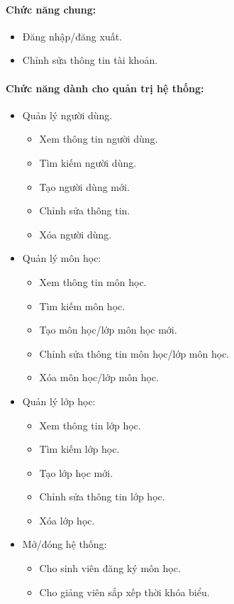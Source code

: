 \documentclass{article}
\begin{document}
    \paragraph{Chức năng chung:}
    \begin{itemize}
      \item Đăng nhập/đăng xuất.
      \item Chỉnh sửa thông tin tài khoản.
    \end{itemize}

    \paragraph{Chức năng dành cho quản trị hệ thống:}
    \begin{itemize}
      \item Quản lý người dùng.
      \begin{itemize}
        \item Xem thông tin người dùng.
        \item Tìm kiếm người dùng.
        \item Tạo người dùng mới.
        \item Chỉnh sửa thông tin.
        \item Xóa người dùng.
      \end{itemize}
      \item Quản lý môn học:
      \begin{itemize}
        \item Xem thông tin môn học.
        \item Tìm kiếm môn học.
        \item Tạo môn học/lớp môn học mới.
        \item Chỉnh sửa thông tin môn học/lớp môn học.
        \item Xóa môn học/lớp môn học.
      \end{itemize}
      \item Quản lý lớp học:
      \begin{itemize}
        \item Xem thông tin lớp học.
        \item Tìm kiếm lớp học.
        \item Tạo lớp học mới.
        \item Chỉnh sửa thông tin lớp học.
        \item Xóa lớp học.
      \end{itemize}
      \item Mở/đóng hệ thống:
      \begin{itemize}
        \item Cho sinh viên đăng ký môn học.
        \item Cho giảng viên sắp xếp thời khóa biểu.
      \end{itemize}
    \end{itemize}
\end{document}

